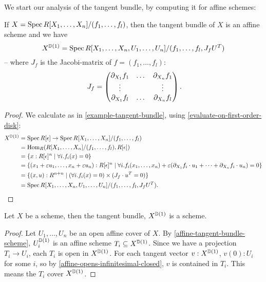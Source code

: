 We start our analysis of the tangent bundle,
by computing it for affine schemes:

\begin{lemma}%
  \label{affine-tangent-bundle-scheme}
  If $X=\operatorname{Spec} R[X_1,\dots,X_n]/(f_1,\dots,f_l)$,
  then the tangent bundle of $X$ is an affine scheme and we have
  \[
    X^{\mathbb{D}(1)}=\operatorname{Spec} R[X_1,\dots,X_n,U_1,\dots,U_n]/(f_1,\dots,f_l,J_f U^T)
  \]
  -- where $J_f$ is the Jacobi-matrix of $f=(f_1,\dots,f_l)$:
  \[
    J_f=
    \left(
      \begin{matrix}
        \partial_{X_1}f_1 & \dots & \partial_{X_n}f_1 \\
        \vdots &  & \vdots \\
        \partial_{X_1}f_l & \dots & \partial_{X_n}f_l 
      \end{matrix}
    \right)
    \rlap{.}
  \]
\end{lemma}

\begin{proof}
  We calculate as in \cref{example-tangent-bundle}, using \cref{evaluate-on-first-order-disk}:
  \begin{align*}
    X^{\D(1)}&= \Spec R[\epsilon] \to \Spec R[X_1,\dots,X_n]/(f_1,\dots,f_l)\\
             &= \Hom_R(R[X_1,\dots,X_n]/(f_1,\dots,f_l),R[\epsilon]) \\
             &= \{ x:R[\epsilon]^n \mid \forall i. f_i(x)=0 \} \\
             &= \{ (x_1+\varepsilon u_1, \dots , x_n+\varepsilon u_n):R[\epsilon]^n \mid \forall i. f_i(x_1,\dots,x_n)+\varepsilon(\partial_{X_1}f_i\cdot u_1+\dots+\partial_{X_n}f_i\cdot u_n) =0 \} \\
             &= \{ (x,u):R^{n+n}\mid (\forall i . f_i(x)=0) \times (J_f\cdot u^T=0) \} \\
             &= \Spec R[X_1,\dots,X_n,U_1,\dots,U_n]/(f_1,\dots,f_l,J_f U^T)
               \rlap{.}
  \end{align*}
\end{proof}

\begin{theorem}%
  Let $X$ be a scheme,
  then the tangent bundle, $X^{\mathbb{D}(1)}$
  is a scheme.
\end{theorem}

\begin{proof}
  Let $U_1,\dots,U_n$ be an open affine cover of $X$.
  By \cref{affine-tangent-bundle-scheme}, $U_i^{\mathbb{D}(1)}$ is an affine scheme $T_i\subseteq X^{\mathbb{D}(1)}$.
  Since we have a projection $T_i\to U_i$, each $T_i$ is open in $X^{\mathbb{D}(1)}$.
  For each tangent vector $v:X^{\mathbb{D}(1)}$,
  $v(0):U_i$ for some $i$,
  so by \cref{affine-opens-infinitesimal-closed},
  $v$ is contained in $T_i$.
  This means the $T_i$ cover $X^{\mathbb{D}(1)}$.
\end{proof}

